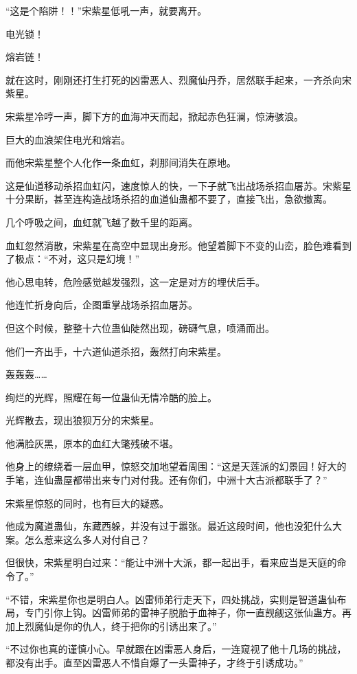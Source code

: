 \begin{this_body}
“这是个陷阱！！”宋紫星低吼一声，就要离开。

电光锁！

熔岩链！

就在这时，刚刚还打生打死的凶雷恶人、烈魔仙丹乔，居然联手起来，一齐杀向宋紫星。

宋紫星冷哼一声，脚下方的血海冲天而起，掀起赤色狂澜，惊涛骇浪。

巨大的血浪架住电光和熔岩。

而他宋紫星整个人化作一条血虹，刹那间消失在原地。

这是仙道移动杀招血虹闪，速度惊人的快，一下子就飞出战场杀招血屠苏。宋紫星十分果断，甚至连构造战场杀招的血道仙蛊都不要了，直接飞出，急欲撤离。

几个呼吸之间，血虹就飞越了数千里的距离。

血虹忽然消散，宋紫星在高空中显现出身形。他望着脚下不变的山峦，脸色难看到了极点：“不对，这只是幻境！”

他心思电转，危险感觉越发强烈，这一定是对方的埋伏后手。

他连忙折身向后，企图重掌战场杀招血屠苏。

但这个时候，整整十六位蛊仙陡然出现，磅礴气息，喷涌而出。

他们一齐出手，十六道仙道杀招，轰然打向宋紫星。

轰轰轰……

绚烂的光辉，照耀在每一位蛊仙无情冷酷的脸上。

光辉散去，现出狼狈万分的宋紫星。

他满脸灰黑，原本的血红大氅残破不堪。

他身上的缭绕着一层血甲，惊怒交加地望着周围：“这是天莲派的幻景园！好大的手笔，连仙蛊屋都带出来专门对付我。还有你们，中洲十大古派都联手了？”

宋紫星惊怒的同时，也有巨大的疑惑。

他成为魔道蛊仙，东藏西躲，并没有过于嚣张。最近这段时间，他也没犯什么大案。怎么惹来这么多人对付自己？

但很快，宋紫星明白过来：“能让中洲十大派，都一起出手，看来应当是天庭的命令了。”

“不错，宋紫星你也是明白人。凶雷师弟行走天下，四处挑战，实则是智道蛊仙布局，专门引你上钩。凶雷师弟的雷神子脱胎于血神子，你一直觊觎这张仙蛊方。再加上烈魔仙是你的仇人，终于把你的引诱出来了。”

“不过你也真的谨慎小心。早就跟在凶雷恶人身后，一连窥视了他十几场的挑战，都没有出手。直至凶雷恶人不惜自爆了一头雷神子，才终于引诱成功。”


\end{this_body}
